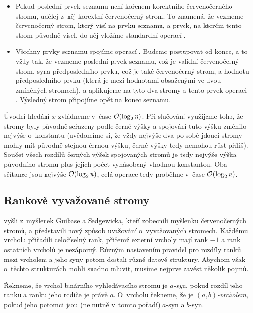 \begin{enumerate}
\begin{itemize}
\item Pokud poslední prvek seznamu není kořenem korektního červenočerného
stromu, udělej z~něj korektní červenočerný strom. To znamená, že vezmeme
červenočerný strom, který visí na prvku seznamu, a prvek, na kterém tento strom původně
visel, do něj vložíme standardní operací .

\item Všechny prvky seznamu spojíme operací . Budeme postupovat od
konce, a to vždy tak, že vezmeme poslední prvek seznamu, což je validní
červenočerný strom, syna předposledního prvku, což je také červenočerný strom,
a hodnotu předposledního prvku (která je mezi hodnotami obsaženými ve dvou zmíněných stromech), a aplikujeme na tyto dva stromy
a tento prvek operaci . Výsledný strom připojíme opět na konec
seznamu. 

\end{itemize}
\end{enumerate}

Úvodní hledání $x$ zvládneme v~čase $\o(\log n)$. Při slučování využijeme
toho, že stromy byly původně seřazeny podle černé výšky a spojování tuto výšku
změnilo nejvýše o~konstantu (uvědomíme si, že vždy nejvýše dva po sobě jdoucí
stromy mohly mít původně stejnou černou výšku, černé výšky tedy nemohou růst
příliš). Součet všech rozdílů černých výšek spojovaných stromů je tedy nejvýše
výška původního stromu plus jejich počet vynásobený vhodnou konstantou. Oba sčítance jsou
nejvýše $\o(\log n)$, celá operace  tedy proběhne v~čase $\o(\log
n)$.

\subsection{Rankově vyvažované stromy}

\citet{rankbalanced} vyšli z~myšlenek Guibase a Sedgewicka\citeyearpar{dichromatic}, kteří zobecnili
myšlenku červenočerných stromů, a představili nový způsob uvažování
o~vyvažovaných stromech. Každému vrcholu přiřadili celočíselný rank, přičemž
externí vrcholy mají rank $-1$ a rank ostatních vrcholů je nezáporný. Různým
nastavením pravidel pro rozdíly ranků mezi vrcholem a jeho syny potom dostali
různé datové struktury. Abychom však o~těchto strukturách mohli snadno mluvit,
musíme nejprve zavést několik pojmů.

\begin{definice}
Řekneme, že vrchol binárního vyhledávacího stromu je \emph{$a$-syn}, pokud rozdíl jeho ranku a ranku jeho rodiče je právě $a$. O~vrcholu řekneme, že je \emph{$(a,b)$-vrcholem}, pokud jeho potomci jsou (ne nutně v~tomto pořadí) $a$-syn a $b$-syn.
\end{definice}

